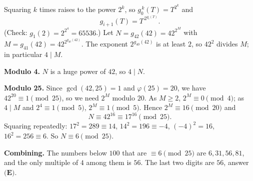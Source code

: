 Squaring $k$ times raises to the power $2^k$, so $g_0^{\,k}(T)=T^{2^k}$ and
\[g_{i+1}(T)=T^{\,2^{g_i(T)}} .\]
(Check: $g_1(2)=2^{2^4}=65536$.) Let $N=g_{42}(42)=42^{2^M}$ with $M=g_{41}(42)=42^{2^{g_{40}(42)}}$. The exponent $2^{g_{40}(42)}$ is at least $2$, so $42^2$ divides $M$; in particular $4\mid M$.

\textbf{Modulo 4.} $N$ is a huge power of $42$, so $4\mid N$.

\textbf{Modulo 25.} Since $\gcd(42,25)=1$ and $\varphi(25)=20$, we have $42^{20}\equiv1\pmod{25}$, so we need $2^M$ modulo $20$. As $M\ge2$, $2^M\equiv0\pmod4$; as $4\mid M$ and $2^4\equiv1\pmod5$, $2^M\equiv1\pmod5$. Hence $2^M\equiv16\pmod{20}$ and
\[N\equiv42^{16}\equiv17^{16}\pmod{25}.\]
Squaring repeatedly: $17^2=289\equiv14$, $14^2=196\equiv-4$, $(-4)^2=16$, $16^2=256\equiv6$. So $N\equiv6\pmod{25}$.

\textbf{Combining.} The numbers below $100$ that are $\equiv6\pmod{25}$ are $6,31,56,81$, and the only multiple of $4$ among them is $56$. The last two digits are $\boxed{56}$, answer $\textbf{(E)}$.
